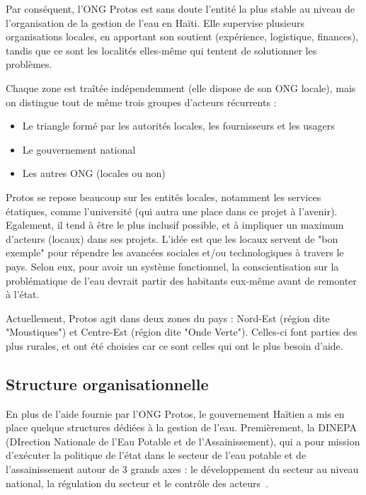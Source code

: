 \documentclass{eplmastersthesis_FR}
\begin{document}
			Par conséquent, l'ONG Protos est sans doute l'entité la plus stable au niveau de l'organisation de la gestion de l'eau en Haïti. Elle supervise plusieurs organisations locales, en apportant son soutient (expérience, logistique, finances), tandis que ce sont les localités elles-même qui tentent de solutionner les problèmes.

			Chaque zone est traîtée indépendemment (elle dispose de son ONG locale), mais on distingue tout de même trois groupes d'acteurs récurrents :
			\begin{itemize}
				\item Le triangle formé par les autorités locales, les fournisseurs et les usagers
				\item Le gouvernement national
				\item Les autres ONG (locales ou non)
			\end{itemize} 

			Protos se repose beaucoup sur les entités locales, notamment les services étatiques, comme l'université (qui autra une place dans ce projet à l'avenir). Egalement, il tend à être le plus inclusif possible, et à impliquer un maximum d'acteurs (locaux) dans ses projets. L'idée est que les locaux servent de "bon exemple" pour répendre les avancées sociales et/ou technologiques à travers le pays. Selon eux, pour avoir un système fonctionnel, la conscientisation sur la problématique de l'eau devrait partir des habitants eux-même avant de remonter à l'état.


			Actuellement, Protos agit dans deux zones du pays : Nord-Est (région dite "Moustiques") et Centre-Est (région dite "Onde Verte"). Celles-ci font parties des plus rurales, et ont été choisies car ce sont celles qui ont le plus besoin d'aide.

			\subsection*{Structure organisationnelle}
			En plus de l'aide fournie par l'ONG Protos, le gouvernement Haïtien a mis en place quelque structures dédiées à la gestion de l'eau. Premièrement, la DINEPA (DIrection Nationale de l'Eau Potable et de l'Assainissement), qui a pour mission d’exécuter la politique de l’état dans le secteur de l’eau potable et de l’assainissement autour de 3 grands axes : le développement du secteur au niveau national, la régulation du secteur et le contrôle des acteurs~\cite{ref:dinepa}.
\end{document}
